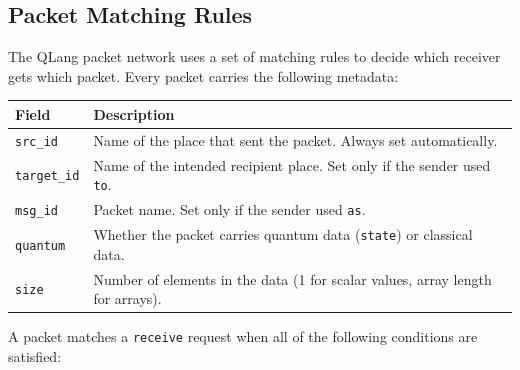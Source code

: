 \subsection{Packet Matching Rules}
\label{sec:packet-matching}

The QLang packet network uses a set of matching rules to decide which
receiver gets which packet. Every packet carries the following metadata:

\begin{center}
\begin{tabular}{|l|p{10cm}|}
\hline
\textbf{Field} & \textbf{Description} \\
\hline
\texttt{src\_id} & Name of the place that sent the packet. Always set automatically. \\
\hline
\texttt{target\_id} & Name of the intended recipient place. Set only if the sender used \texttt{to}. \\
\hline
\texttt{msg\_id} & Packet name. Set only if the sender used \texttt{as}. \\
\hline
\texttt{quantum} & Whether the packet carries quantum data (\texttt{state}) or classical data. \\
\hline
\texttt{size} & Number of elements in the data (1 for scalar values, array length for arrays). \\
\hline
\end{tabular}
\end{center}

A packet matches a \texttt{receive} request when all of the following
conditions are satisfied:

